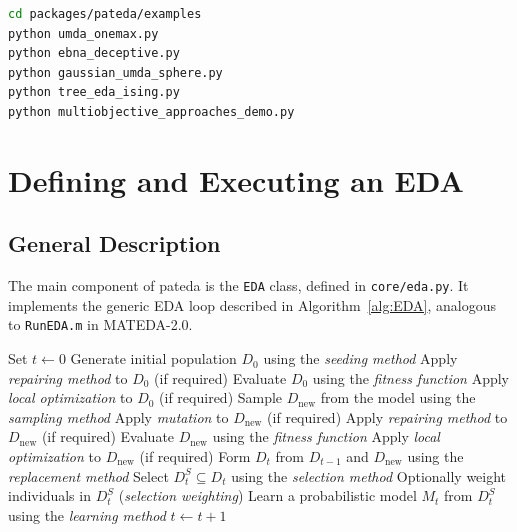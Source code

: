 \documentclass[a4paper,11pt]{article}
\begin{document}
\begin{lstlisting}[language=bash]
cd packages/pateda/examples
python umda_onemax.py
python ebna_deceptive.py
python gaussian_umda_sphere.py
python tree_eda_ising.py
python multiobjective_approaches_demo.py
\end{lstlisting}

\section{Defining and Executing an EDA}
\label{sec:eda}

\subsection{General Description}

The main component of pateda is the \texttt{EDA} class, defined in
\texttt{core/eda.py}.  It implements the generic EDA loop described in
Algorithm~\ref{alg:EDA}, analogous to \texttt{RunEDA.m} in MATEDA-2.0.

\begin{algorithm}
\caption{Estimation of Distribution Algorithm}
\label{alg:EDA}
\begin{algorithmic}[1]
\State Set $t \leftarrow 0$
\Repeat
    \State Generate initial population $D_0$ using the \emph{seeding method}
    \State Apply \emph{repairing method} to $D_0$ (if required)
    \State Evaluate $D_0$ using the \emph{fitness function}
    \State Apply \emph{local optimization} to $D_0$ (if required)
  \Else
    \State Sample $D_\text{new}$ from the model using the \emph{sampling method}
    \State Apply \emph{mutation} to $D_\text{new}$ (if required)
    \State Apply \emph{repairing method} to $D_\text{new}$ (if required)
    \State Evaluate $D_\text{new}$ using the \emph{fitness function}
    \State Apply \emph{local optimization} to $D_\text{new}$ (if required)
    \State Form $D_t$ from $D_{t-1}$ and $D_\text{new}$ using the \emph{replacement method}
  \EndIf
  \State Select $D_t^S \subseteq D_t$ using the \emph{selection method}
  \State Optionally weight individuals in $D_t^S$ (\emph{selection weighting})
  \State Learn a probabilistic model $M_t$ from $D_t^S$ using the \emph{learning method}
  \State $t \leftarrow t + 1$
\end{algorithmic}
\end{algorithm}
\end{document}
